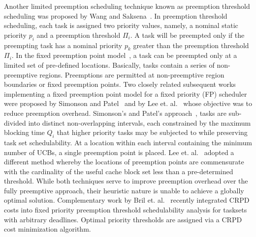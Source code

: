 Another limited preemption scheduling technique known as preemption threshold scheduling was proposed by Wang and Saksena~\cite{wang:99}.  In preemption threshold scheduling, each task is assigned two priority values, namely, a nominal static priority \begin{math}p_{i}\end{math} and a preemption threshold \begin{math}\Pi_{i}\end{math}.  A task will be preempted only if the preempting task has a nominal priority \begin{math}p_{k}\end{math} greater than the preemption threshold \begin{math}\Pi_{i}\end{math}. In the fixed preemption point model~\cite{burns:05}, a task can be preempted only at a limited set of pre-defined locations. Basically, tasks contain a series of non-preemptive regions.  Preemptions are permitted at non-preemptive region boundaries or fixed preemption points.
\newline
\indent
Two closely related subsequent works implementing a fixed preemption point model for a fixed priority (FP) scheduler were proposed by Simonson and Patel~\cite{simonson:95} and by Lee et. al.~\cite{lee:98} whose objective was to reduce preemption overhead.  Simonson’s and Patel’s approach~\cite{simonson:95}, tasks are sub-divided into distinct non-overlapping intervals, each constrained by the maximum blocking time \begin{math}Q_{i}\end{math} that higher priority tasks may be subjected to while preserving task set schedulability.  At a location within each interval containing the minimum number of UCBs, a single preemption point is placed.  Lee et. al.~\cite{lee:98} adopted a different method whereby the locations of preemption points are commensurate with the cardinality of the useful cache block set less than a pre-determined threshold.   While both techniques serve to improve preemption overhead over the fully preemptive approach, their heuristic nature is unable to achieve a globally optimal solution.
\newline
\indent
Complementary work by Bril et. al.~\cite{bril:14} recently integrated CRPD costs into fixed priority preemption threshold schedulability analysis for tasksets with arbitrary deadlines.  Optimal priority thresholds are assigned via a CRPD cost minimization algorithm.
\newline
